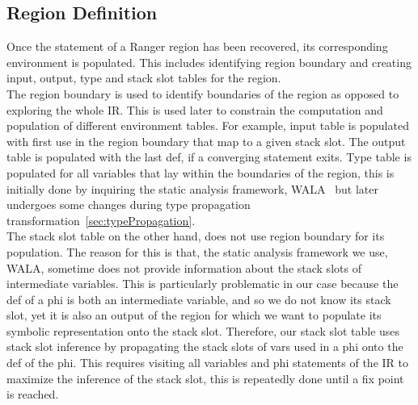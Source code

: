 \subsection{Region Definition}
Once the statement of a Ranger region has been recovered, its corresponding environment is populated.
%
This includes identifying region boundary and creating input, output, type and stack slot tables for the region.\\
%
The region boundary is used to identify boundaries of the region as opposed to exploring the whole IR.
%
This is used later to constrain the computation and population of different environment tables.
%
For example, input table is populated with first use in the region boundary that map to a given stack slot.
%
The output table is populated with the last def, if a converging statement exits.
%
Type table is populated for all variables that lay within the boundaries of the region, this is initially done by inquiring the static analysis framework, WALA~\cite{} but later undergoes some changes during type propagation transformation~\ref{sec:typePropagation}.   \\
%
The stack slot table on the other hand, does not use region boundary for its population.
%
The reason for this is that, the static analysis framework we use, WALA, sometime does not provide information about the stack slots of intermediate variables.
This is particularly problematic in our case because the def of a phi is both an intermediate variable, and so we do not know its stack slot, yet it is also an output of the region for which we want to populate its symbolic representation onto the stack slot.
%
Therefore, our stack slot table uses stack slot inference by propagating the stack slots of vars used in a phi onto the def of the phi.
%
This requires visiting all variables and phi statements of the IR to maximize the inference of the stack slot, this is repeatedly done until a fix point is reached.
%


